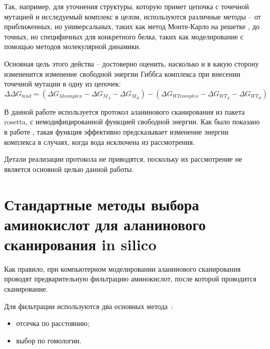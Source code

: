 Так, например, для уточнения структуры, которую примет цепочка с точечной мутацией и исследуемый комплекс в целом, используются различные методы -- от приближенных, но универсальных, таких как метод Монте-Карло на решетке \cite{monte_carlo}, до точных, но специфичных для конкретного белка, таких как моделирование с помощью методов молекулярной динамики.

Основная цель этого действа -- достоверно оценить, насколько и в какую сторону измененится изменение свободной энергии Гиббса \ddG комплекса при внесении точечной мутации в одну из цепочек:
$$
\Delta\Delta G_{bind} = (\Delta G_{M complex} - \Delta G_{M_A} - \Delta G_{M_B}) - (\Delta G_{WT complex} - \Delta G_{WT_A} - \Delta G_{WT_B})
$$

В данной работе используется протокол аланинового сканирования из пакета rosetta, с немодифицированной функцией свободной энергии. Как было показано в работе \cite{kortemme2002}, такая функция  эффективно предсказывает изменение энергии комплекса в случаях, когда вода исключена из рассмотрения.

Детали реализации протокола не приводятся, поскольку их рассмотрение не является основной целью данной работы.





\section{Стандартные методы выбора аминокислот для аланинового сканирования in silico}

Как правило, при компьютерном моделировании аланинового сканирования проводят предварительную фильтрацию аминокислот, после которой проводится сканирование. 

Для фильтрации используются два основных метода~\cite{hotspots2012rev}:
\begin{itemize}
\item отсечка по расстоянию;

\item выбор по гомологии.
\end{itemize}

